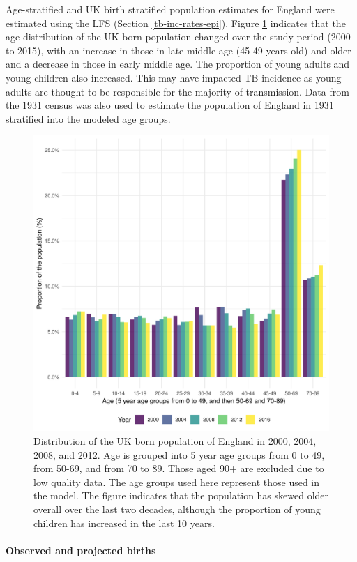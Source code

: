 \documentclass[11pt,twoside]{bristolthesis}
\begin{document}
  Age-stratified and UK birth stratified population estimates for England were estimated using the LFS (Section \ref{tb-inc-rates-epi}). Figure \ref{fig:age-strat-demo} indicates that the age distribution of the UK born population changed over the study period (2000 to 2015), with an increase in those in late middle age (45-49 years old) and older and a decrease in those in early middle age. The proportion of young adults and young children also increased. This may have impacted TB incidence as young adults are thought to be responsible for the majority of transmission. Data from the 1931 census was also used to estimate the population of England in 1931 stratified into the modeled age groups.
  \begin{figure}
  
  {\centering \includegraphics[width=0.8\linewidth,]{chapters/model-development/resources/figure/england_demographics} 
  
  }
  
  \caption[Distribution of the UK born population of England in 2000, 2004, 2008, and 2012.]{Distribution of the UK born population of England in 2000, 2004, 2008, and 2012. Age is grouped into 5 year age groups from 0 to 49, from 50-69, and from 70 to 89. Those aged 90+ are excluded due to low quality data. The age groups used here represent those used in the model. The figure indicates that the population has skewed older overall over the last two decades, although the proportion of young children has increased in the last 10 years.}\label{fig:age-strat-demo}
  \end{figure}
  \hypertarget{observed-and-projected-births}{%
  \paragraph{Observed and projected births}\label{observed-and-projected-births}}
  
\end{document}
